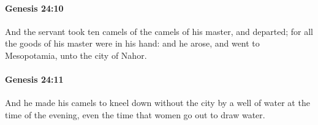 		\paragraph{Genesis 24:10} %
			\label{GENESIS-24-10}

			And the servant took ten camels of the camels of his master, and departed; for all the goods of his master were in his hand: and he arose, and went to Mesopotamia, unto the city of Nahor.


		\paragraph{Genesis 24:11} %
			\label{GENESIS-24-11}

			And he made his camels to kneel down without the city by a well of water at the time of the evening, even the time that women go out to draw water.


